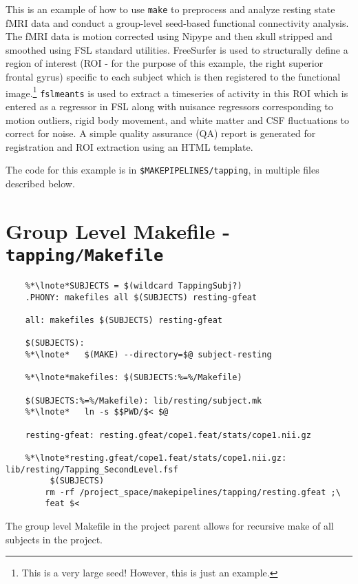 \label{example:fcconnectivity2}

This is an example of how to use \texttt{make} to preprocess and
analyze resting state fMRI data and conduct a group-level seed-based
functional connectivity
analysis. The fMRI data is motion corrected using Nipype
\citep{nipype2011} and then skull stripped and smoothed using FSL
\citep{jenkinson2012fsl} standard utilities. FreeSurfer is used to
structurally define a region of interest (ROI - for the purpose of
this example, the right superior frontal gyrus) specific to each
subject which is then registered to the functional
image.\footnote{This is a very large seed! However, this is just an
  example.} \texttt{fslmeants} is used to extract a timeseries of
activity in this ROI which is entered as a regressor in FSL along with
nuisance regressors corresponding to motion outliers, rigid body
movement, and white matter and CSF fluctuations to correct for
noise. A simple quality assurance (QA) report is generated for
registration and ROI extraction using an HTML template.

The code for this example is in \texttt{\$MAKEPIPELINES/tapping}, in
multiple files described below.

\section{Group Level Makefile - \texttt{tapping/Makefile}}
\begin{lstlisting}
	%*\lnote*SUBJECTS = $(wildcard TappingSubj?)
	.PHONY: makefiles all $(SUBJECTS) resting-gfeat
	
	all: makefiles $(SUBJECTS) resting-gfeat
	
	$(SUBJECTS):
	%*\lnote*	$(MAKE) --directory=$@ subject-resting

	%*\lnote*makefiles: $(SUBJECTS:%=%/Makefile)
	
	$(SUBJECTS:%=%/Makefile): lib/resting/subject.mk
	%*\lnote*	ln -s $$PWD/$< $@
	
	resting-gfeat: resting.gfeat/cope1.feat/stats/cope1.nii.gz
	
	%*\lnote*resting.gfeat/cope1.feat/stats/cope1.nii.gz: lib/resting/Tapping_SecondLevel.fsf
		 $(SUBJECTS)
		rm -rf /project_space/makepipelines/tapping/resting.gfeat ;\
		feat $<
\end{lstlisting}

The group level Makefile in the project parent allows for recursive make of all subjects in the project. 

